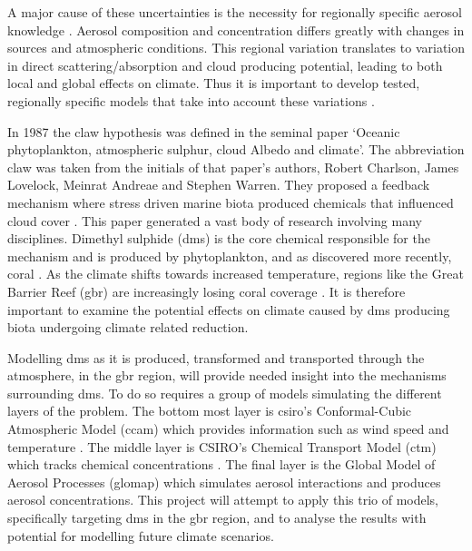 A major cause of these uncertainties is the necessity for regionally specific aerosol knowledge \citep{intergovernmentalpanelonclimatechange:2015fa}. Aerosol composition and concentration differs greatly with changes in sources and atmospheric conditions. This regional variation translates to variation in direct scattering/absorption and cloud producing potential, leading to both local and global effects on climate. Thus it is important to develop tested, regionally specific models that take into account these variations \citep{cainey:2007jj, simpson:2014}. 

In 1987 the \gls{claw} hypothesis was defined in the seminal paper `Oceanic phytoplankton, atmospheric sulphur, cloud Albedo and climate'. The abbreviation \gls{claw} was taken from the initials of that paper's authors, Robert Charlson, James Lovelock, Meinrat Andreae and Stephen Warren. They proposed a feedback mechanism where stress driven marine biota produced chemicals that influenced cloud cover \citep{charlson:1987fw}. This paper generated a vast body of research involving many disciplines. Dimethyl sulphide (\gls{dms}) is the core chemical responsible for the mechanism and is produced by phytoplankton, and as discovered more recently, coral \citep{raina:2013fj}. As the climate shifts towards increased temperature, regions like the Great Barrier Reef (\gls{gbr}) are increasingly losing coral coverage \citep{hoeghguldberg:1999bi}. It is therefore important to examine the potential effects on climate caused by \gls{dms} producing biota undergoing climate related reduction.

Modelling \gls{dms} as it is produced, transformed and transported through the atmosphere, in the \gls{gbr} region, will provide needed insight into the mechanisms surrounding \gls{dms}. To do so requires a group of models simulating the different layers of the problem. The bottom most layer is \gls{csiro}'s Conformal-Cubic Atmospheric Model (\gls{ccam}) which provides information such as wind speed and temperature \citep{mcgregor:2005wz}. The middle layer is CSIRO's Chemical Transport Model (\gls{ctm}) which tracks chemical concentrations \citep{cope:2009tz}. The final layer is the Global Model of Aerosol Processes (\gls{glomap}) which simulates aerosol interactions and produces aerosol concentrations. This project will attempt to apply this trio of models, specifically targeting \gls{dms} in the \gls{gbr} region, and to analyse the results with potential for modelling future climate scenarios.

